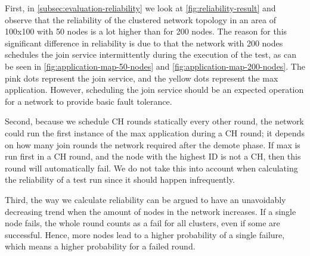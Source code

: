 First, in \cref{subsec:evaluation-reliability} we look at \cref{fig:reliability-result} and observe that the reliability of the clustered network topology in an area of 100x100 with 50 nodes is a lot higher than for 200 nodes. The reason for this significant difference in reliability is due to that the network with 200 nodes schedules the join service intermittently during the execution of the test, as can be seen in \cref{fig:application-map-50-nodes} and \cref{fig:application-map-200-nodes}. The pink dots represent the join service, and the yellow dots represent the max application. However, scheduling the join service should be an expected operation for a network to provide basic fault tolerance. 

Second, because we schedule CH rounds statically every other round, the network could run the first instance of the max application during a CH round; it depends on how many join rounds the network required after the demote phase. If max is run first in a CH round, and the node with the highest ID is not a CH, then this round will automatically fail. We do not take this into account when calculating the reliability of a test run since it should happen infrequently.

Third, the way we calculate reliability can be argued to have an unavoidably decreasing trend when the amount of nodes in the network increases. If a single node fails, the whole round counts as a fail for all clusters, even if some are successful. Hence, more nodes lead to a higher probability of a single failure, which means a higher probability for a failed round.






